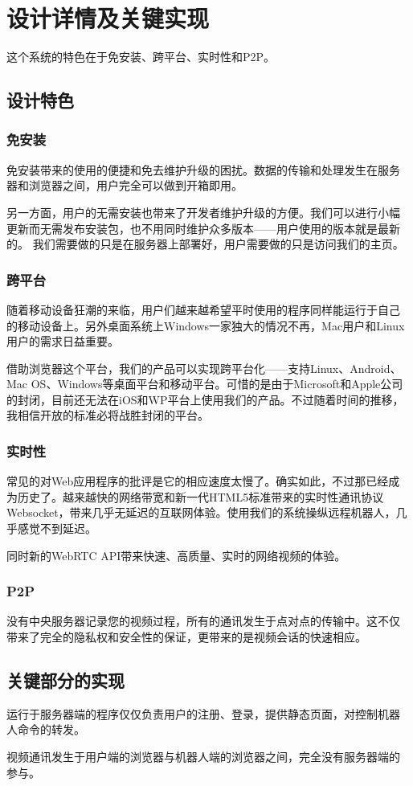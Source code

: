 \chapter{设计详情及关键实现}

这个系统的特色在于免安装、跨平台、实时性和P2P。

\section{设计特色}

\subsection{免安装}

免安装带来的使用的便捷和免去维护升级的困扰。数据的传输和处理发生在服务
器和浏览器之间，用户完全可以做到开箱即用。

另一方面，用户的无需安装也带来了开发者维护升级的方便。我们可以进行小幅
更新而无需发布安装包，也不用同时维护众多版本——用户使用的版本就是最新的。
我们需要做的只是在服务器上部署好，用户需要做的只是访问我们的主页。

\subsection{跨平台}

随着移动设备狂潮的来临，用户们越来越希望平时使用的程序同样能运行于自己
的移动设备上。另外桌面系统上Windows一家独大的情况不再，Mac用户和Linux
用户的需求日益重要。

借助浏览器这个平台，我们的产品可以实现跨平台化——支持Linux、Android、
Mac OS、Windows等桌面平台和移动平台。可惜的是由于Microsoft和Apple公司
的封闭，目前还无法在iOS和WP平台上使用我们的产品。不过随着时间的推移，
我相信开放的标准必将战胜封闭的平台。

\subsection{实时性}

常见的对Web应用程序的批评是它的相应速度太慢了。确实如此，不过那已经成
为历史了。越来越快的网络带宽和新一代HTML5标准带来的实时性通讯协议
Websocket，带来几乎无延迟的互联网体验。使用我们的系统操纵远程机器人，几
乎感觉不到延迟。

同时新的WebRTC API带来快速、高质量、实时的网络视频的体验。

\subsection{P2P}

没有中央服务器记录您的视频过程，所有的通讯发生于点对点的传输中。这不仅
带来了完全的隐私权和安全性的保证，更带来的是视频会话的快速相应。

\section{关键部分的实现}

运行于服务器端的程序仅仅负责用户的注册、登录，提供静态页面，对控制机器
人命令的转发。

视频通讯发生于用户端的浏览器与机器人端的浏览器之间，完全没有服务器端的
参与。
